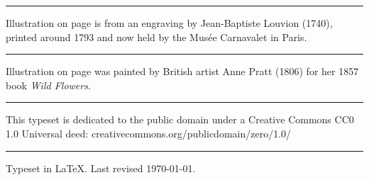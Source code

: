 \documentclass[
a5paper,
BCOR=7mm,
twoside,
DIV=calc,
12pt,
usegeometry,
chapterprefix,
endperiod,
headings=big]{scrbook}
\begin{document}
\rule{0.5\textwidth}{.4pt}

Illustration on page \pageref{guillotine} is from an engraving by Jean-Baptiste Louvion (1740), printed around 1793 and now held by the Musée Carnavalet in Paris. 

\rule{0.5\textwidth}{.4pt}

Illustration on page \pageref{flowers} was painted by British artist Anne Pratt (1806) for her 1857 book \textit{Wild Flowers}. 

\rule{0.5\textwidth}{.4pt}

This typeset is dedicated to the public domain under a Creative Commons CC0 1.0 Universal deed: creativecommons.org/publicdomain/zero/1.0/

\rule{0.5\textwidth}{.4pt}

Typeset in \LaTeX{}. Last revised \today.
\enlargethispage{\baselineskip}
\thispagestyle{empty}
\end{document}
